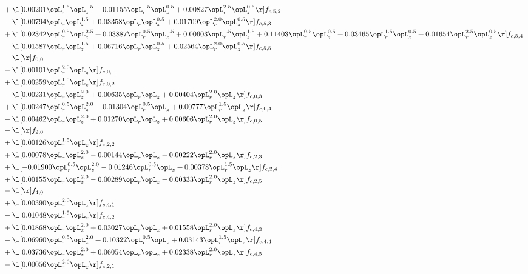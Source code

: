 \begin{alignat}{2}
& + \l[  0.00201 \opL_r^{1.5} \opL_z^{1.5} +  0.01155 \opL_r^{1.5} \opL_z^{0.5} +  0.00827 \opL_r^{2.5} \opL_z^{0.5}  \r] f_{c,5,2} \nonumber \\ 
& - \l[  0.00794 \opL_r \opL_z^{1.5} +  0.03358 \opL_r \opL_z^{0.5} +  0.01709 \opL_r^{2.0} \opL_z^{0.5}  \r] f_{c,5,3} \nonumber \\ 
& + \l[  0.02342 \opL_r^{0.5} \opL_z^{2.5} +  0.03887 \opL_r^{0.5} \opL_z^{1.5} +  0.00603 \opL_r^{1.5} \opL_z^{1.5} +  0.11403 \opL_r^{0.5} \opL_z^{0.5} +  0.03465 \opL_r^{1.5} \opL_z^{0.5} +  0.01654 \opL_r^{2.5} \opL_z^{0.5}  \r] f_{c,5,4} \nonumber \\ 
& - \l[  0.01587 \opL_r \opL_z^{1.5} +  0.06716 \opL_r \opL_z^{0.5} +  0.02564 \opL_r^{2.0} \opL_z^{0.5}  \r] f_{c,5,5} \nonumber \\ 
& - \l[  \r] f_{0,0} \nonumber \\ 
& - \l[  0.00101 \opL_r^{2.0} \opL_z  \r] f_{c,0,1} \nonumber \\ 
& + \l[  0.00259 \opL_r^{1.5} \opL_z  \r] f_{c,0,2} \nonumber \\ 
& - \l[  0.00231 \opL_r \opL_z^{2.0} +  0.00635 \opL_r \opL_z +  0.00404 \opL_r^{2.0} \opL_z  \r] f_{c,0,3} \nonumber \\ 
& + \l[  0.00247 \opL_r^{0.5} \opL_z^{2.0} +  0.01304 \opL_r^{0.5} \opL_z +  0.00777 \opL_r^{1.5} \opL_z  \r] f_{c,0,4} \nonumber \\ 
& - \l[  0.00462 \opL_r \opL_z^{2.0} +  0.01270 \opL_r \opL_z +  0.00606 \opL_r^{2.0} \opL_z  \r] f_{c,0,5} \nonumber \\ 
& - \l[  \r] f_{2,0} \nonumber \\ 
& + \l[  0.00126 \opL_r^{1.5} \opL_z  \r] f_{c,2,2} \nonumber \\ 
& + \l[  0.00078 \opL_r \opL_z^{2.0}   -0.00144 \opL_r \opL_z   -0.00222 \opL_r^{2.0} \opL_z  \r] f_{c,2,3} \nonumber \\ 
& + \l[  -0.01900 \opL_r^{0.5} \opL_z^{2.0}   -0.01246 \opL_r^{0.5} \opL_z +  0.00378 \opL_r^{1.5} \opL_z  \r] f_{c,2,4} \nonumber \\ 
& + \l[  0.00155 \opL_r \opL_z^{2.0}   -0.00289 \opL_r \opL_z   -0.00333 \opL_r^{2.0} \opL_z  \r] f_{c,2,5} \nonumber \\ 
& - \l[  \r] f_{4,0} \nonumber \\ 
& + \l[  0.00390 \opL_r^{2.0} \opL_z  \r] f_{c,4,1} \nonumber \\ 
& - \l[  0.01048 \opL_r^{1.5} \opL_z  \r] f_{c,4,2} \nonumber \\ 
& + \l[  0.01868 \opL_r \opL_z^{2.0} +  0.03027 \opL_r \opL_z +  0.01558 \opL_r^{2.0} \opL_z  \r] f_{c,4,3} \nonumber \\ 
& - \l[  0.06960 \opL_r^{0.5} \opL_z^{2.0} +  0.10322 \opL_r^{0.5} \opL_z +  0.03143 \opL_r^{1.5} \opL_z  \r] f_{c,4,4} \nonumber \\ 
& + \l[  0.03736 \opL_r \opL_z^{2.0} +  0.06054 \opL_r \opL_z +  0.02338 \opL_r^{2.0} \opL_z  \r] f_{c,4,5} \nonumber \\ 
& - \l[  0.00056 \opL_r^{2.0} \opL_z  \r] f_{c,2,1} \nonumber \\ 
\end{alignat} 


